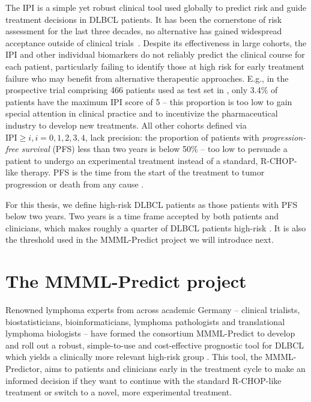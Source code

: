 The IPI is a simple yet robust clinical tool used globally to predict risk and guide 
treatment decisions in DLBCL patients. It has been the cornerstone of risk assessment for the last 
three decades, no alternative has gained widespread acceptance outside of clinical 
trials~\citep{ipi-stay-strong}. 
Despite its effectiveness in large cohorts, the IPI and other individual 
biomarkers do not reliably predict the clinical course for each patient, particularly failing to 
identify those at high risk for early treatment failure who may benefit from alternative therapeutic 
approaches. E.g., in the prospective trial comprising \num{466} patients used as test set in 
\citep{staiger20}, only \num{3.4}\% of patients have the maximum IPI score of 5 -- this proportion 
is too low 
to gain special attention in clinical practice and to incentivize the pharmaceutical industry to 
develop new treatments. All other cohorts defined via $\text{IPI} \geq i, i = 0, 1, 2, 3, 4$, lack 
precision: the proportion of patients with \textit{progression-free survival} (PFS) less than two 
years is below \num{50}\% -- too low to persuade a patient to undergo an experimental treatment 
instead of a standard, R-CHOP-like therapy. PFS is the time from the start of the treatment to tumor 
progression or death from any cause \cite{saad09}.

For this thesis, we define high-risk DLBCL patients as those patients with PFS below two years. 
Two years is a time 
frame accepted by both patients and clinicians, which makes roughly a quarter of DLBCL patients 
high-risk \cite{staiger20}. It is also the threshold used in the MMML-Predict project we will 
introduce next.

\section{The MMML-Predict project} \label{sec:intro-mmml}

Renowned lymphoma experts from across academic Germany -- clinical trialists, biostatisticians, 
bioinformaticians, lymphoma pathologists and translational lymphoma biologists -- have formed the 
consortium MMML-Predict to develop and roll out a robust, simple-to-use and cost-effective 
prognostic tool for DLBCL 
which yields a clinically more relevant high-risk group \cite{mmml-chapuy,mmml-idw}. This tool, the 
MMML-Predictor, aims to 
patients and clinicians early in the treatment cycle to make an informed decision if they want to 
continue with the standard R-CHOP-like treatment or switch to a novel, more experimental treatment. 


